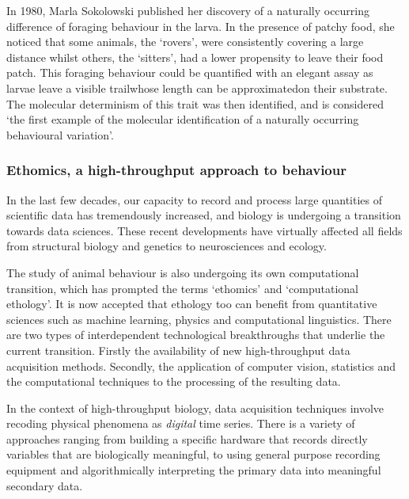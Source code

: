 In 1980, Marla Sokolowski published her discovery of a naturally occurring difference of foraging behaviour in the larva.
In the presence of patchy food, she noticed that some animals, the `rovers', were consistently covering a large distance whilst others, the `sitters', had a lower propensity to leave their food patch.
This foraging behaviour could be quantified with an elegant assay as larvae leave a visible trail\emd{}whose length can be approximated\emd{}on their substrate. The molecular  determinism of this trait was then identified\cite{osborne_natural_1997}, and is considered `the first example of the molecular identification of a naturally occurring behavioural variation'\cite{sokolowski_drosophila_2001}.

\subsubsection{Ethomics, a high-throughput approach to behaviour}
\label{sec:tracking-tools}
In the last few decades, our capacity to record and process large quantities of scientific data has tremendously increased\cite{stephens_big_2015}, and biology is undergoing a transition towards data sciences.
These recent developments have virtually affected all fields from
structural biology\cite{levitt_birth_2001-3} and 
genetics\cite{schatz_biological_2015} to
neurosciences\cite{sejnowski_putting_2014} and
ecology\cite{pascual_computational_2005}.


The study of animal behaviour is also undergoing its own computational transition,
which has prompted the terms `ethomics'\cite{branson_high-throughput_2009, reiser_ethomics_2009} and `computational ethology'\cite{anderson_toward_2014}. 
It is now accepted that ethology too can benefit from quantitative sciences such as machine learning, physics and computational linguistics\cite{gomez-marin_big_2014,egnor_computational_2016,brown_ethology_2018, berman_measuring_2018}.
There are two types of interdependent technological breakthroughs that underlie the current transition.
Firstly the availability of new high-throughput data acquisition methods.
Secondly, the application of computer vision, statistics and the computational techniques to the processing of the resulting data.

In the context of high-throughput biology, data acquisition techniques involve recoding
physical phenomena as \emph{digital} time series. 
There is a variety of approaches ranging from building a specific hardware that records directly variables that are biologically meaningful, to using general purpose recording equipment and algorithmically interpreting the primary data into meaningful secondary data.

